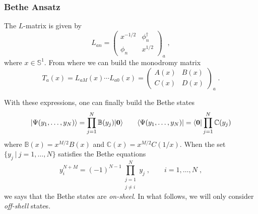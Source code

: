 \documentclass[a4paper,11pt]{amsart}
\begin{document}
\subsubsection{Bethe Ansatz}
The \(L\)-matrix is given by 
\begin{equation}
  L_{an} = 
\begin{pmatrix}
x^{ - 1/2} & \phi_n^\dagger \\ \phi_n & x^{1/2}
\end{pmatrix}_a\; , 
\end{equation}
where \(x \in \mathbb{S}^1\). From where we can build the monodromy
matrix
\begin{equation}
  T_a(x) = L_{aM}(x) \cdots L_{a0}(x) = 
\begin{pmatrix}
A(x) & B(x) \\ C(x) & D(x)
\end{pmatrix}_a\; .
\end{equation}

With these expressions, one can finally build the Bethe states
\begin{equation}
  \lvert\Psi(y_1, \dots, y_N)\rangle = \prod_{j=1}^N \mathbb{B}(y_j) \lvert\bm{0}\rangle \qquad 
  \langle\Psi(y_1, \dots, y_N)\rvert = \langle\bm{0}\rvert\prod_{j=1}^N \mathbb{C}(y_j) 
\end{equation}
where \(\mathbb{B}(x) = x^{M/2} B(x)\) and \(\mathbb{C}(x) = x^{M/2} C(1/x)\).
When the set \(\{ y_j \ | \ j
=1, \dots , N\}\) satisfies the Bethe equations
\begin{equation}
\label{eq:bethe_eq}
  y^{N + M}_i = (-1)^{N-1} \prod_{\substack{j = 1 \\ j \neq i}}^N y_j\; , \qquad i = 1, \dots, N\; , 
\end{equation}
we says that the Bethe states are \emph{on-sheel}. In what follows, we will 
only consider \emph{off-shell} states. 

\end{document}
